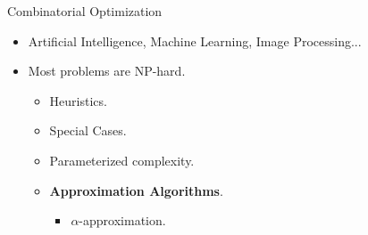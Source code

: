 \begin{frame}{Combinatorial Optimization}
\begin{itemize}[<+->]
  \item Artificial Intelligence, Machine Learning, Image Processing...
  \item Most problems are NP-hard.
	\begin{itemize}[<+->]
	  \item Heuristics.
	  \item Special Cases.
	  \item Parameterized complexity.
	  \item \textbf{Approximation Algorithms}.
		\begin{itemize}[<+->]
			\item $\alpha$-approximation.
		\end{itemize}
	\end{itemize}
\end{itemize}
\end{frame}